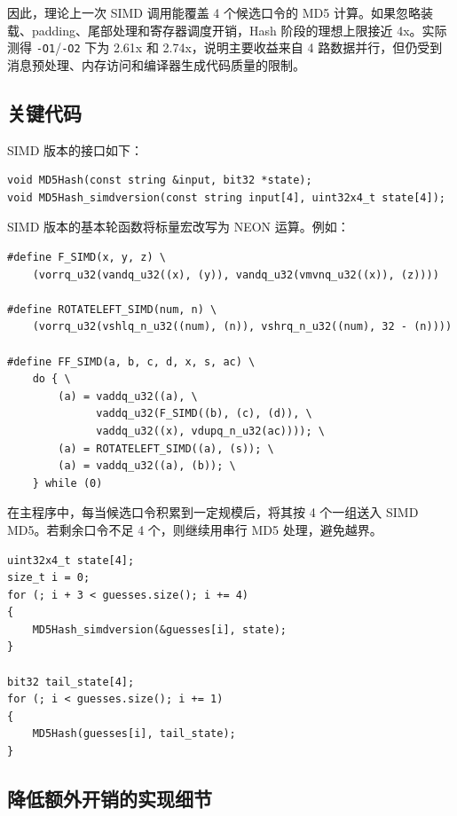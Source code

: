 \documentclass[UTF8,a4paper,12pt]{ctexart}
\begin{document}
因此，理论上一次 SIMD 调用能覆盖 4 个候选口令的 MD5 计算。如果忽略装载、padding、尾部处理和寄存器调度开销，Hash 阶段的理想上限接近 4x。实际测得 \texttt{-O1}/\texttt{-O2} 下为 2.61x 和 2.74x，说明主要收益来自 4 路数据并行，但仍受到消息预处理、内存访问和编译器生成代码质量的限制。

\subsection{关键代码}

SIMD 版本的接口如下：

\begin{lstlisting}[style=cppstyle,caption={SIMD MD5 接口}]
void MD5Hash(const string &input, bit32 *state);
void MD5Hash_simdversion(const string input[4], uint32x4_t state[4]);
\end{lstlisting}

SIMD 版本的基本轮函数将标量宏改写为 NEON 运算。例如：

\begin{lstlisting}[style=cppstyle,caption={NEON 轮函数}]
#define F_SIMD(x, y, z) \
    (vorrq_u32(vandq_u32((x), (y)), vandq_u32(vmvnq_u32((x)), (z))))

#define ROTATELEFT_SIMD(num, n) \
    (vorrq_u32(vshlq_n_u32((num), (n)), vshrq_n_u32((num), 32 - (n))))

#define FF_SIMD(a, b, c, d, x, s, ac) \
    do { \
        (a) = vaddq_u32((a), \
              vaddq_u32(F_SIMD((b), (c), (d)), \
              vaddq_u32((x), vdupq_n_u32(ac)))); \
        (a) = ROTATELEFT_SIMD((a), (s)); \
        (a) = vaddq_u32((a), (b)); \
    } while (0)
\end{lstlisting}

在主程序中，每当候选口令积累到一定规模后，将其按 4 个一组送入 SIMD MD5。若剩余口令不足 4 个，则继续用串行 MD5 处理，避免越界。

\begin{lstlisting}[style=cppstyle,caption={main.cpp 中的批量哈希}]
uint32x4_t state[4];
size_t i = 0;
for (; i + 3 < guesses.size(); i += 4)
{
    MD5Hash_simdversion(&guesses[i], state);
}

bit32 tail_state[4];
for (; i < guesses.size(); i += 1)
{
    MD5Hash(guesses[i], tail_state);
}
\end{lstlisting}

\subsection{降低额外开销的实现细节}
\end{document}
